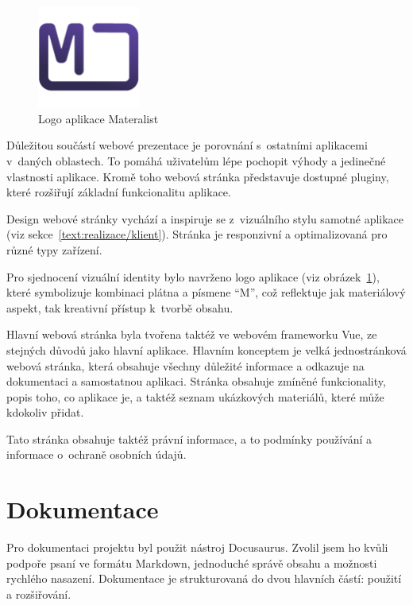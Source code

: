 \begin{figure}[ht!]
    \centering
    \includegraphics[width=0.3\textwidth]{media/05_realizace/logo.png}
    \caption{Logo aplikace Materalist}
    \label{fig:logo}
\end{figure}

Důležitou součástí webové prezentace je porovnání s~ostatními aplikacemi v~daných oblastech. 
To pomáhá uživatelům lépe pochopit výhody a jedinečné vlastnosti aplikace. 
Kromě toho webová stránka představuje dostupné pluginy, které rozšiřují základní funkcionalitu aplikace.

Design webové stránky vychází a inspiruje se z~vizuálního stylu samotné aplikace (viz sekce~\ref{text:realizace/klient}). 
Stránka je responzivní a optimalizovaná pro různé typy zařízení.

Pro sjednocení vizuální identity bylo navrženo logo aplikace (viz obrázek~\ref{fig:logo}), které symbolizuje kombinaci plátna a písmene \enquote{M}, což reflektuje jak materiálový aspekt, tak kreativní přístup k~tvorbě obsahu.

Hlavní webová stránka byla tvořena taktéž ve webovém frameworku Vue, ze stejných důvodů jako hlavní aplikace.
Hlavním konceptem je velká jednostránková webová stránka, která obsahuje všechny důležité informace a odkazuje na dokumentaci a samostatnou aplikaci.
Stránka obsahuje zmíněné funkcionality, popis toho, co aplikace je, a taktéž seznam ukázkových materiálů, které může kdokoliv přidat.

Tato stránka obsahuje taktéž právní informace, a to podmínky používání a informace o~ochraně osobních údajů.


\section{Dokumentace}

Pro dokumentaci projektu byl použit nástroj Docusaurus. 
Zvolil jsem ho kvůli podpoře psaní ve formátu Markdown, jednoduché správě obsahu a možnosti rychlého nasazení. 
Dokumentace je strukturovaná do dvou hlavních částí: použití a rozšiřování.

